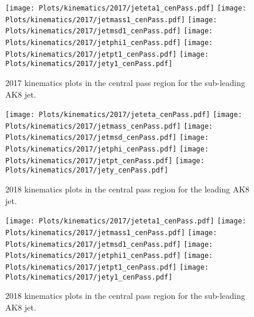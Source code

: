 \begin{figure}[htp]
	\begin{center}

		\texttt{[image: Plots/kinematics/2017/jeteta1\_cenPass.pdf]}
		\texttt{[image: Plots/kinematics/2017/jetmass1\_cenPass.pdf]}
		\texttt{[image: Plots/kinematics/2017/jetmsd1\_cenPass.pdf]}
		\texttt{[image: Plots/kinematics/2017/jetphi1\_cenPass.pdf]}
		\texttt{[image: Plots/kinematics/2017/jetpt1\_cenPass.pdf]}
		\texttt{[image: Plots/kinematics/2017/jety1\_cenPass.pdf]}

		\caption{2017 kinematics plots in the central pass region for the sub-leading AK8 jet.}
		\label{fig:kin2017_cenpass1}
	\end{center}
\end{figure}



\begin{figure}[htp]
	\begin{center}
		
		\texttt{[image: Plots/kinematics/2017/jeteta\_cenPass.pdf]}
		\texttt{[image: Plots/kinematics/2017/jetmass\_cenPass.pdf]}
		\texttt{[image: Plots/kinematics/2017/jetmsd\_cenPass.pdf]}
		\texttt{[image: Plots/kinematics/2017/jetphi\_cenPass.pdf]}
		\texttt{[image: Plots/kinematics/2017/jetpt\_cenPass.pdf]}
		\texttt{[image: Plots/kinematics/2017/jety\_cenPass.pdf]}
		
		\caption{2018 kinematics plots in the central pass region for the leading AK8 jet.}
		\label{fig:kin2018_cenpass}
	\end{center}
\end{figure}



\begin{figure}[htp]
	\begin{center}

		\texttt{[image: Plots/kinematics/2017/jeteta1\_cenPass.pdf]}
		\texttt{[image: Plots/kinematics/2017/jetmass1\_cenPass.pdf]}
		\texttt{[image: Plots/kinematics/2017/jetmsd1\_cenPass.pdf]}
		\texttt{[image: Plots/kinematics/2017/jetphi1\_cenPass.pdf]}
		\texttt{[image: Plots/kinematics/2017/jetpt1\_cenPass.pdf]}
		\texttt{[image: Plots/kinematics/2017/jety1\_cenPass.pdf]}

		\caption{2018 kinematics plots in the central pass region for the sub-leading AK8 jet.}
		\label{fig:kin2018_cenpass1}
	\end{center}
\end{figure}


